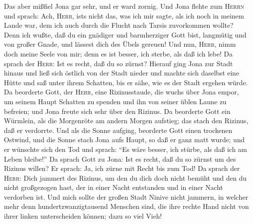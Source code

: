  Das aber mißfiel Jona gar sehr, und er ward zornig.
 Und Jona flehte zum \textsc{Herrn} und sprach: Ach,
\textsc{Herr}, ist\textquotesingle s nicht das, was ich mir sagte, als
ich noch in meinem Lande war, dem ich auch durch die Flucht nach Tarsis
zuvorkommen wollte? Denn ich wußte, daß du ein gnädiger und barmherziger
Gott bist, langmütig und von großer Gnade, und lässest dich des Übels
gereuen!  Und nun, \textsc{Herr}, nimm doch meine Seele
von mir; denn es ist besser, ich sterbe, als daß ich lebe!
 Da sprach der \textsc{Herr}: Ist es recht, daß du so
zürnst?  Hierauf ging Jona zur Stadt hinaus und ließ sich
östlich von der Stadt nieder und machte sich daselbst eine Hütte und saß
unter ihrem Schatten, bis er sähe, wie es der Stadt ergehen würde.
 Da beorderte Gott, der \textsc{Herr}, eine Rizinusstaude,
die wuchs über Jona empor, um seinem Haupt Schatten zu spenden und ihn
von seiner üblen Laune zu befreien; und Jona freute sich sehr über den
Rizinus.  Da beorderte Gott ein Würmlein, als die
Morgenröte am andern Morgen aufstieg; das stach den Rizinus, daß er
verdorrte.  Und als die Sonne aufging, beorderte Gott
einen trockenen Ostwind, und die Sonne stach Jona aufs Haupt, so daß er
ganz matt wurde; und er wünschte sich den Tod und sprach: ``Es wäre
besser, ich stürbe, als daß ich am Leben bleibe!''  Da
sprach Gott zu Jona: Ist es recht, daß du so zürnst um des Rizinus
willen? Er sprach: Ja, ich zürne mit Recht bis zum Tod! 
Da sprach der \textsc{Herr}: Dich jammert des Rizinus, um den du dich
doch nicht bemüht und den du nicht großgezogen hast, der in einer Nacht
entstanden und in einer Nacht verdorben ist.  Und mich
sollte der großen Stadt Ninive nicht jammern, in welcher mehr denn
hundertzwanzigtausend Menschen sind, die ihre rechte Hand nicht von
ihrer linken unterscheiden können; dazu so viel Vieh!
